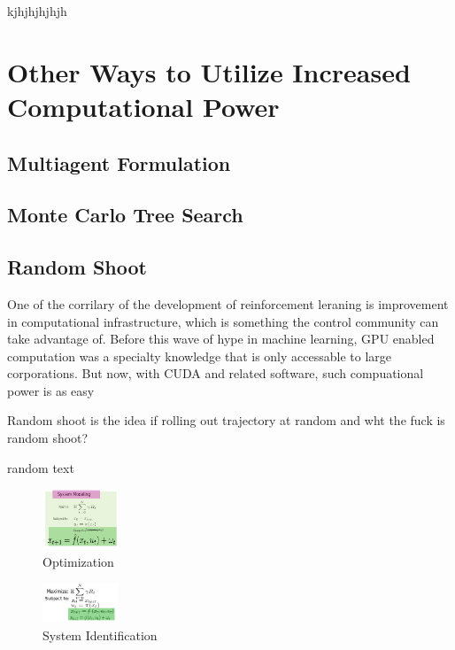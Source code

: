 \documentclass[journal]{IEEEtran}
\begin{document}
kjhjhjhjhjh






\section{Other Ways to Utilize Increased Computational Power}
\subsection{Multiagent Formulation}
\subsection{Monte Carlo Tree Search}



\subsection{Random Shoot}
One of the corrilary of the development of reinforcement leraning is improvement in computational infrastructure, which is something the control community can take advantage of. Before this wave of hype in machine learning, GPU enabled computation was a specialty knowledge that is only accessable to large corporations. But now, with CUDA and related software, such compuational power is as easy

Random shoot is the idea if rolling out trajectory at random and wht the fuck is random shoot?












random text

\begin{figure}[H]
    \centering
    \includegraphics[width=0.2\textwidth]{Control1.png}
    \caption{Optimization}
    \label{fig:CO}
\end{figure}

\begin{figure}[H]
    \centering
    \includegraphics[width=0.2\textwidth]{Control2.png}
    \caption{System Identification}
    \label{fig:SI}
\end{figure}
\end{document}
